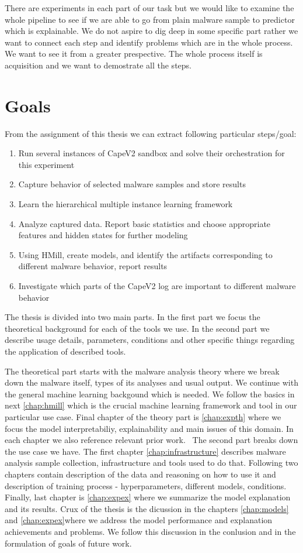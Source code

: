 There are experiments in each part of our task but we would like to examine the whole pipeline to see if we are able to go from plain malware sample to predictor which is explainable. We do not aspire to dig deep in some specific part rather we want to connect each step and identify problems which are in the whole process. We want to see it from a greater prespective. The whole process itself is acquisition and we want to demostrate all the steps.
\section{Goals}
From the assignment of this thesis we can extract following particular steps/goal:
\begin{enumerate}
    \item Run several instances of CapeV2 \cite{Cape} sandbox and solve their orchestration for this experiment
    \item Capture behavior of selected malware samples and store results
    \item Learn the hierarchical multiple instance learning framework
    \item Analyze captured data. Report basic statistics and choose appropriate features and hidden states for further modeling
    \item Using HMill, create models, and identify the artifacts corresponding to different malware behavior, report results
    \item Investigate which parts of the CapeV2 log are important to different malware behavior
\end{enumerate}

The thesis is divided into two main parts. In the first part we focus the theoretical background for each of the tools we use. In the second part we describe usage details, parameters, conditions and other specific things regarding the application of described tools.

The theoretical part starts with the malware analysis theory where we break down the malware itself, types of its analyses and usual output. We continue with the general machine learning backgound which is needed. We follow the basics in next \ref{chap:hmill} which is the crucial machine learning framework and tool in our particular use case. Final chapter of the theory part is \ref{chap:expth} where we focus the model interpretabiliy, explainability and main issues of this domain. In each chapter we also reference relevant prior work.
\
The second part breaks down the use case we have. The first chapter \ref{chap:infrastructure} describes malware analysis sample collection, infrastructure and tools used to do that. Following two chapters contain description of the data and reasoning on how to use it and description of training process - hyperparameters, different models, conditions. Finally, last chapter is \ref{chap:expex} where we summarize the model explanation and its results. Crux of the thesis is the dicussion in the chapters \ref{chap:models} and \ref{chap:expex}where we address the model performance and explanation achievements and problems. We follow this discussion in the conlusion and in the formulation of goals of future work.



